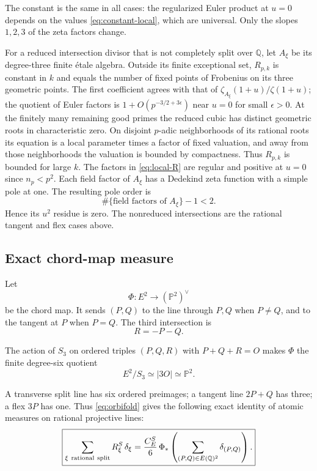 \documentclass[11pt]{article}
\begin{document}
The constant is the same in all cases:
the regularized Euler product at $u=0$
depends on the values \eqref{eq:constant-local},
which are universal. Only the slopes
$1,2,3$ of the zeta factors change.

For a reduced intersection divisor that is not completely split over
$\mathbb Q$, let $A_\xi$ be its degree-three finite \'etale algebra.
Outside its finite exceptional set, $R_{p,k}$ is constant in $k$ and
equals the number of fixed points of Frobenius on its three geometric
points. The first coefficient agrees with that of
$\zeta_{A_\xi}(1+u)/\zeta(1+u)$; the quotient of Euler factors is
$1+O(p^{-3/2+3\epsilon})$ near $u=0$ for small $\epsilon>0$.
At the finitely many remaining good primes the reduced cubic has
distinct geometric roots in characteristic zero. On disjoint
$p$-adic neighborhoods of its rational roots its equation is a local
parameter times a factor of fixed valuation, and away from those
neighborhoods the valuation is bounded by compactness. Thus $R_{p,k}$
is bounded for large $k$. The factors in \eqref{eq:local-R} are regular
and positive at $u=0$ since $n_p<p^2$. Each field factor of $A_\xi$
has a Dedekind zeta function with a simple pole at one. The resulting
pole order is
\[
\#\{\text{field factors of }A_\xi\}-1<2.
\]
Hence its $u^2$ residue is zero.
The nonreduced intersections are the
rational tangent and flex cases above.

\subsection{Exact chord-map measure}

Let
\[
\Phi:E^2\longrightarrow(\mathbb P^2)^\vee
\]
be the chord map. It sends $(P,Q)$
to the line through $P,Q$ when $P\ne Q$,
and to the tangent at $P$ when $P=Q$.
The third intersection is
\[
R=-P-Q.
\]

The action of $S_3$ on ordered triples
$(P,Q,R)$ with $P+Q+R=O$
makes $\Phi$ the finite degree-six quotient
\[
E^2/S_3\simeq |3O|\simeq\mathbb P^2.
\]

A transverse split line has six ordered
preimages; a tangent line $2P+Q$
has three; a flex $3P$ has one.
Thus \eqref{eq:orbifold} gives the
following exact identity of atomic
measures on rational projective lines:
\begin{equation}\label{eq:measure-push}
\boxed{
\sum_{\xi\ {\rm rational\ split}}
R_\xi^S\,\delta_\xi
=
\frac{C_E^S}{6}\,
\Phi_*\left(
\sum_{(P,Q)\in E(\mathbb Q)^2}
\delta_{(P,Q)}
\right).
}
\end{equation}
\end{document}
